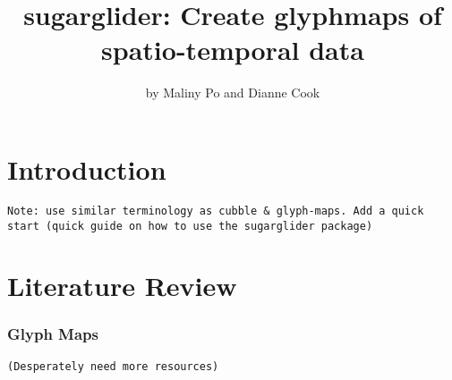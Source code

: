 \title{sugarglider: Create glyphmaps of spatio-temporal data}


\author{by Maliny Po and Dianne Cook}

\maketitle


\hypertarget{introduction}{%
\section{Introduction}\label{introduction}}

\begin{verbatim}
Note: use similar terminology as cubble & glyph-maps. Add a quick start (quick guide on how to use the sugarglider package)
\end{verbatim}

\hypertarget{literature-review}{%
\section{Literature Review}\label{literature-review}}

\hypertarget{glyph-maps}{%
\subsubsection{Glyph Maps}\label{glyph-maps}}

\begin{verbatim}
(Desperately need more resources)
\end{verbatim}

